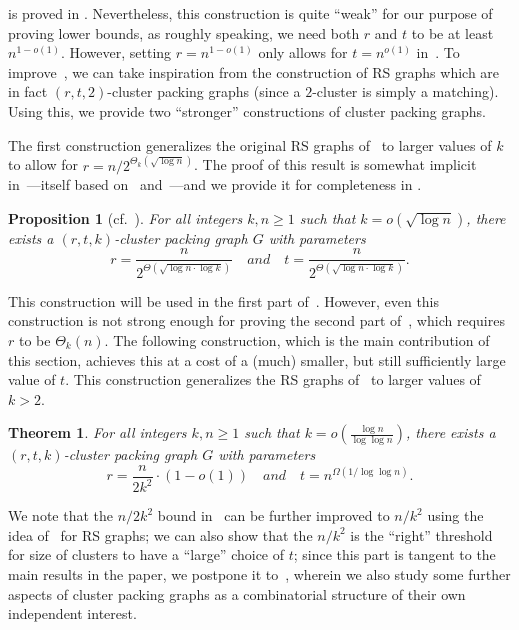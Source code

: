 \documentclass[11pt]{article}
\newtheorem{theorem}{Theorem}
\newtheorem{proposition}[lemma]{Proposition}
\theoremstyle{definition}
\renewcommand{\geq}{\geqslant}
\begin{document}
 is proved in .
Nevertheless, this construction is quite ``weak'' for our purpose of proving lower bounds, as roughly speaking, we need both $r$ and $t$ to be at least $n^{1-o(1)}$. However, setting $r=n^{1-o(1)}$ only allows for $t=n^{o(1)}$ in~. To improve~, we can take inspiration from the construction of RS graphs which are in fact $(r,t,2)$-cluster packing graphs (since a $2$-cluster is simply a matching). 
Using this, we provide two ``stronger'' constructions of cluster packing graphs. 

The first construction generalizes the original RS graphs of~\cite{RuzsaS78} to larger values of $k$ to allow for $r = n/2^{\Theta_k(\sqrt{\log{n}})}$. The proof of this result 
is somewhat implicit in~\cite{AssadiKNS24}---itself based on~\cite{Alon01} and~\cite{AbboudB16}---and we provide it for completeness in . 

\begin{proposition}[cf.~\cite{AssadiKNS24}]\label{prop:cpg-dense}
	For all integers $k,n \geq 1$ such that $k = o(\sqrt{\log{n}})$, there exists a $(r,t,k)$-cluster packing graph $G$ with parameters 
	\[
		r = \frac{n}{2^{\Theta(\sqrt{\log{n} \cdot \log{k}})}} \quad and \quad t = \frac{n}{2^{\Theta(\sqrt{\log{n} \cdot \log{k}})}}. 
	\]
\end{proposition}

This construction will be used in the first part of~. However, even this construction is not strong enough for proving the second part of~, which requires $r$ to be $\Theta_k(n)$.  
The following construction, which is the main contribution of this section, achieves this at a cost of a (much) smaller, but still sufficiently large value of $t$. This construction generalizes the RS graphs of~\cite{FischerLNRRS02}
to larger values of $k > 2$. 

\begin{theorem}\label{prop:cpg-large-r}
	For all integers $k,n \geq 1$ such that $k = o(\frac{\log{n}}{\log\log{n}})$, there exists a $(r,t,k)$-cluster packing graph $G$ with parameters 
	\[
		r = \frac{n}{2k^2} \cdot (1-o(1)) \quad and \quad t = n^{\Omega(1/\log\log{n})}. 
	\]
\end{theorem}

We note that the $n/2k^2$ bound in~ can be further improved to $n/k^2$ using the idea of~\cite{GoelKK12} for RS graphs; 
we can also show that the $n/k^2$ is the ``right'' threshold for size of clusters to have a ``large'' choice of $t$; since this part is tangent to the main results in the paper, we postpone it to~, wherein we also study some further aspects of cluster packing graphs 
as a combinatorial structure of their own independent interest. 
\end{document}
